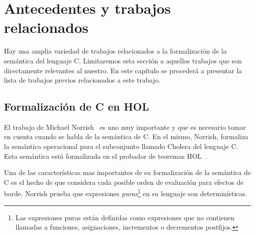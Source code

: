 \chapter{Antecedentes y trabajos relacionados}\label{chapter:previous}


Hay una amplia variedad de trabajos relacionados a la formalización de la semántica del lenguaje C.
Limitaremos esta sección a aquellos trabajos que son directamente relevantes al nuestro.
En este capítulo se procederá a presentar la lista de trabajos previos relacionados a este trabajo.

\begin{comment}
Primero, se hablará de la formalización de C en HOL de Michael Norrish~\cite{norrish}.
Este trabajo está relacionado al presente porque formaliza la semántica de un subconjunto de C utilizando HOL y el subconjunto de C para el cual se formaliza la semántica es mas grande que el presentado en este trabajo.

Luego, se discutirá el modelo de memoria utilizado en la verificación formal del compilador CompCert~\cite{leroy-blazy-memory-model}
En el presente trabajo se adopta el modelo de memoria utilizado por el compilador verificado de C del proyecto CompCert.

Finalmente, se mencionará el proyecto Autocorres~\cite{autocorres}, el cual tiene como fin el abstraer la semántica de bajo nivel de C a una representación de más alto nivel.
Este proyecto traduce código de lenguaje C a la lógica de un probador de teoremas con el fin de poder probar propiedades del código fuente en C.
\end{comment}

\section{Formalización de C en HOL}

El trabajo de Michael Norrish~\cite{norrish} es uno muy importante y que es necesario tomar en cuenta cuando se habla de la semántica de C.
En el mismo, Norrish, formaliza la semántica operacional para el subconjunto llamado Cholera del lenguaje C.
Esta semántica está formalizada en el probador de teoremas HOL~\cite{hol-doc}.

Una de las características mas importantes de su formalización de la semántica de C es el hecho de que considera cada posible orden de evaluación para efectos de borde.
Norrish prueba que expresiones \textit{puras}\footnote{Las expresiones puras están definidas como expresiones que no contienen llamadas a funciones, asignaciones, incrementos o decrementos postfijos.} en su lenguaje son determinísticas.

